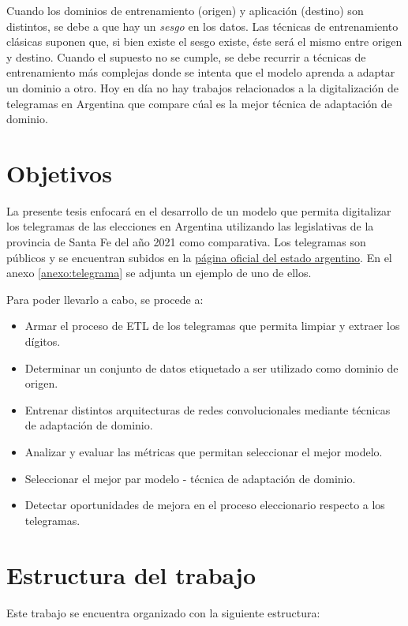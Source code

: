 Cuando los dominios de entrenamiento (origen) y aplicaci\'on (destino) son distintos, se debe a que hay un {\it sesgo}
en los datos. Las t\'ecnicas de entrenamiento cl\'asicas suponen que, si bien existe el sesgo existe, \'este ser\'a el
mismo entre origen y destino. Cuando el supuesto no se cumple, se debe recurrir a t\'ecnicas de entrenamiento m\'as
complejas donde se intenta que el modelo aprenda a adaptar un dominio a otro. Hoy en d\'ia no hay trabajos relacionados
a la digitalizaci\'on de telegramas en Argentina que compare c\'ual es la mejor t\'ecnica de adaptaci\'on de dominio.

\section{Objetivos}

La presente tesis enfocar\'a en el desarrollo de un modelo que permita digitalizar los telegramas de las elecciones en
Argentina utilizando las legislativas de la provincia de Santa Fe del a\~{n}o 2021 como comparativa. Los telegramas son
p\'ublicos y se encuentran subidos en la \href{https://op.elecciones.gob.ar/telegramas/generales2021/}{p\'agina oficial
    del estado argentino}. En el anexo \ref{anexo:telegrama} se adjunta un ejemplo de uno de ellos.

Para poder llevarlo a cabo, se procede a:
\begin{itemize}
    \item Armar el proceso de ETL de los telegramas que permita limpiar y extraer los d\'igitos.
    \item Determinar un conjunto de datos etiquetado a ser utilizado como dominio de origen.
    \item Entrenar distintos arquitecturas de redes convolucionales mediante t\'ecnicas de adaptaci\'on de dominio.
    \item Analizar y evaluar las m\'etricas que permitan seleccionar el mejor modelo.
    \item Seleccionar el mejor par modelo - t\'ecnica de adaptación de dominio.
    \item Detectar oportunidades de mejora en el proceso eleccionario respecto a los telegramas.
\end{itemize}

\section{Estructura del trabajo}
Este trabajo se encuentra organizado con la siguiente estructura:

